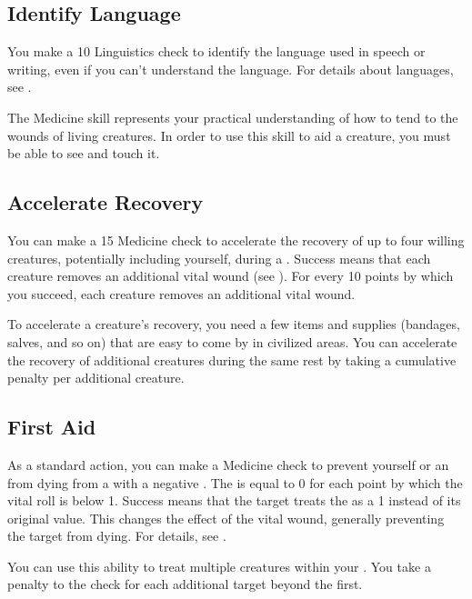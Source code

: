     \subsection{Identify Language}
        You make a  10 Linguistics check to identify the language used in speech or writing, even if you can't understand the language.
        For details about languages, see .

\newpage
{}
    The Medicine skill represents your practical understanding of how to tend to the wounds of living creatures.
    In order to use this skill to aid a creature, you must be able to see and touch it.

    \subsection{Accelerate Recovery}\label{Accelerate Recovery}
        You can make a  15 Medicine check to accelerate the recovery of up to four willing creatures, potentially including yourself, during a .
        Success means that each creature removes an additional vital wound (see ).
        For every 10 points by which you succeed, each creature removes an additional vital wound.

        To accelerate a creature's recovery, you need a few items and supplies (bandages, salves, and so on) that are easy to come by in civilized areas.
        You can accelerate the recovery of additional creatures during the same rest by taking a cumulative  penalty per additional creature.

    \subsection{First Aid}\label{First Aid}
        As a standard action, you can make a Medicine check to prevent yourself or an  from dying from a  with a negative .
        The  is equal to 0  for each point by which the vital roll is below 1.
        Success means that the target treats the  as a 1 instead of its original value.
        This changes the effect of the vital wound, generally preventing the target from dying.
        For details, see .

        You can use this ability to treat multiple creatures within your .
        You take a  penalty to the check for each additional target beyond the first.

